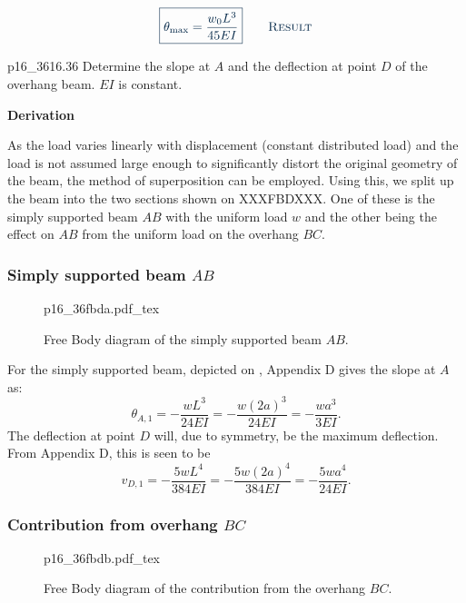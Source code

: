 \documentclass[a4paper]{article}
\newcommand{\incfig}[2][1]{%
  \def\svgwidth{#1\columnwidth}
  {#2.pdf_tex}
}
\newcounter{problem}
\numberwithin{equation}{problem}
\newcommand{\AUheading}[1]{%
  \par\vspace{.4\baselineskip}%
  {\sffamily\bfseries\color{AUblueDark}#1\par}%
  \nobreak%
}
\newenvironment{derivation}[1][Derivation]{%
  \AUheading{#1}
  \begingroup\allowdisplaybreaks
  \setlength{\abovedisplayskip}{6pt}%
  \setlength{\belowdisplayskip}{6pt}%
  \setlength{\abovedisplayshortskip}{4pt}%
  \setlength{\belowdisplayshortskip}{4pt}%
}{\par\endgroup\medskip}
\newcommand{\finalresult}[1]{%
  \vspace{.2\baselineskip}%
  \begin{equation}
    {\color{AUblueDark}\boxed{\displaystyle #1}}
    \tag*{\textsc{\textcolor{AUblueDark}{Result}}}
  \end{equation}
  \newpage
}
\begin{document}
\finalresult{
\theta_{\mathrm{max}} = \frac{w_0 L^3}{45EI}
}

\begin{problemwithimage}{p16_36}{16.36}\label{pro:16-36}
  Determine the slope at $A$ and the deflection at point $D$ of the overhang beam.
  $EI$ is constant.
\end{problemwithimage}



\begin{derivation}
  As the load varies linearly with displacement (constant distributed load) and the load is not assumed large enough to significantly distort the original geometry of the beam, the method of superposition can be employed.
  Using this, we split up the beam into the two sections shown on XXXFBDXXX. %
  One of these is the simply supported beam $AB$ with the uniform load $w$ and the other being the effect on $AB$ from the uniform load on the overhang $BC$.

  \subsubsection*{Simply supported beam $AB$}
  \begin{figure}[ht]
    \centering
    \incfig{p16_36fbda}
    \caption{Free Body diagram of the simply supported beam $AB$.}
    \label{fig:p16_36fbda}
\end{figure}
  For the simply supported beam, depicted on , Appendix D gives the slope at $A$ as:
  \begin{equation*}
    \theta_{A,1} = - \frac{w L^3}{24 EI} = - \frac{w \left( 2a \right)^3}{24 EI} = - \frac{wa^3}{3EI}
  .\end{equation*}
  The deflection at point $D$ will, due to symmetry, be the maximum deflection.
  From Appendix D, this is seen to be
  \begin{equation*}
    v_{D,1} = - \frac{5 w L^{4}}{384 EI} = - \frac{5 w \left( 2a \right)^{4}}{384 EI} =- \frac{5 w a^{4}}{24EI}
  .\end{equation*}
  
  \subsubsection*{Contribution from overhang $BC$}

  \begin{figure}[ht]
    \centering
    \incfig[0.7]{p16_36fbdb}
    \caption{Free Body diagram of the contribution from the overhang $BC$.}
    \label{fig:p16_36fbdb}
  \end{figure}


\end{derivation}
\end{document}
